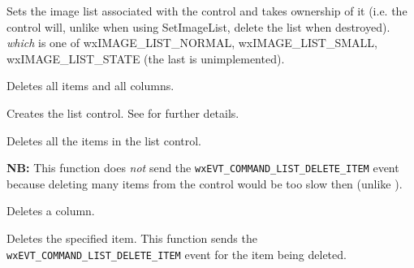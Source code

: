 \label{wxlistctrlassignimagelist}


Sets the image list associated with the control and 
takes ownership of it (i.e. the control will, unlike when using
SetImageList, delete the list when destroyed). {\it which} is one of
wxIMAGE\_LIST\_NORMAL, wxIMAGE\_LIST\_SMALL, wxIMAGE\_LIST\_STATE (the last is unimplemented).




\label{wxlistctrlclearall}


Deletes all items and all columns.


\label{wxlistctrlcreate}


Creates the list control. See  for further details.


\label{wxlistctrldeleteallitems}


Deletes all the items in the list control.

{\bf NB:} This function does {\it not} send the
{\tt wxEVT\_COMMAND\_LIST\_DELETE\_ITEM} event because deleting many items
from the control would be too slow then (unlike ).


\label{wxlistctrldeletecolumn}


Deletes a column.


\label{wxlistctrldeleteitem}


Deletes the specified item. This function sends the
{\tt wxEVT\_COMMAND\_LIST\_DELETE\_ITEM} event for the item being deleted.

